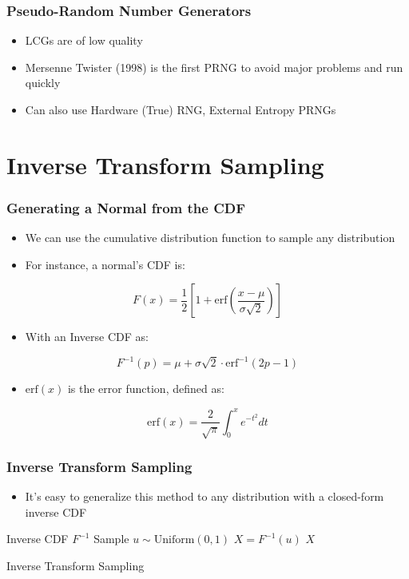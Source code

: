 \documentclass{beamer}
\begin{document}
\begin{frame}
  \frametitle{Pseudo-Random Number Generators}
  \begin{itemize}
    \item LCGs are of low quality
    \item Mersenne Twister (1998) is the first PRNG to avoid major problems and run quickly
    \item Can also use Hardware (True) RNG, External Entropy PRNGs
  \end{itemize}
\end{frame}



\section{Inverse Transform Sampling}
\begin{frame}
\frametitle{Generating a Normal from the CDF}
\begin{itemize}
  \item We can use the cumulative distribution function to sample any distribution
  \item For instance, a normal's CDF is:
\end{itemize}
\begin{equation*}
  F(x) = \frac{1}{2} \left[ 1 + \text{erf}\left( \frac{x - \mu}{\sigma \sqrt{2}} \right) \right]
\end{equation*}
\begin{itemize}
  \item With an Inverse CDF as:
\end{itemize}
\begin{equation*}
  F^{-1}(p) = \mu + \sigma \sqrt{2} \cdot \text{erf}^{-1}\left( 2p - 1 \right)
\end{equation*}
\begin{itemize}
  \item $\text{erf}(x)$ is the error function, defined as:
\end{itemize}
\begin{equation*}
  \text{erf}(x) = \frac{2}{\sqrt{\pi}} \int^{x}_{0} e^{-t^2} dt
\end{equation*}
\end{frame}


\begin{frame}
\frametitle{Inverse Transform Sampling}
\begin{itemize}
  \item It's easy to generalize this method to any distribution with a closed-form inverse CDF
\end{itemize}
\begin{algorithm}[H]
\begin{algorithmic}[1]
  \REQUIRE Inverse CDF $F^{-1}$
  \STATE Sample $u \sim \text{Uniform}(0, 1)$
  \STATE $X = F^{-1} (u)$
  \ENSURE $X$
\end{algorithmic}
\caption{Inverse Transform Sampling}
\end{algorithm}
\end{frame}
\end{document}
